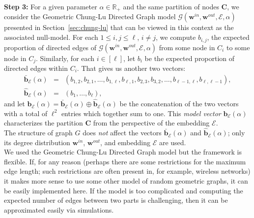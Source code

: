 \documentclass[11pt]{article}
\newcommand{\R}{{\mathbb R}}
\newcommand{\emb}{\mathcal E}
\begin{document}
\medskip \noindent \textbf{Step 3:} For a given parameter $\alpha \in \R_+$ and the same partition of nodes $\textbf{C}$, we consider the Geometric Chung-Lu Directed Graph model $\mathcal{G}(\textbf{w}^{in}, \textbf{w}^{out}, \emb, \alpha)$ presented in Section~\ref{sec:chung-lu} that can be viewed in this context as the associated null-model. For each $1 \le i, j \le \ell$, $i \neq j$, we compute $b_{i,j}$, the expected proportion of directed edges of $\mathcal{G}(\textbf{w}^{in}, \textbf{w}^{out}, \emb, \alpha)$ from some node in $C_i$ to some node in $C_j$. Similarly, for each $i \in [\ell]$, let $b_i$ be the expected proportion of directed edges within $C_i$. That gives us another two vectors:
\begin{eqnarray}
\bar{\textbf{b}}_\emb(\alpha) &=& (b_{1,2}, b_{2,1}, \ldots, b_{1,\ell}, b_{\ell,1}, b_{2,3}, b_{3,2}, \ldots, b_{\ell-1,\ell}, b_{\ell,\ell-1} ), \nonumber \\
\hat{\textbf{b}}_\emb(\alpha) &=& (b_{1},\ldots,  b_{\ell} ),  \label{eq:b}
\end{eqnarray}
and let $\textbf{b}_\emb(\alpha) = \bar{\textbf{b}}_\emb(\alpha) \oplus \hat{\textbf{b}}_\emb(\alpha)$ be the concatenation of the two vectors with a total of $\ell^2$ entries which together sum to one. This \emph{model vector} $\textbf{b}_\emb(\alpha)$ characterizes the partition $\textbf{C}$ from the perspective of the embedding $\emb$. \\
The structure of graph $G$ does \emph{not} affect the vectors $\bar{\textbf{b}}_\emb(\alpha)$ and $\hat{\textbf{b}}_\emb(\alpha)$; only its degree distribution $\textbf{w}^{in}$, $\textbf{w}^{out}$, and embedding $\emb$ are used.\\
We used the Geometric Chung-Lu Directed Graph model but the framework is flexible. If, for any reason (perhaps there are some restrictions for the maximum edge length; such restrictions are often present in, for example, wireless networks) it makes more sense to use some other model of random geometric graphs, it can be easily implemented here. If the model is too complicated and computing the expected number of edges between two parts is challenging, then it can be approximated easily via simulations.
\end{document}
